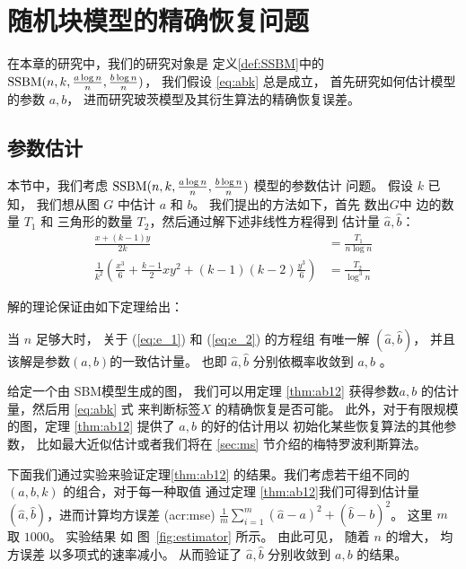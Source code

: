 
\chapter{随机块模型的精确恢复问题}\label{chap:sibm}

在本章的研究中，我们的研究对象是
定义\ref{def:SSBM}中的
$\operatorname{SSBM}(n,k,\frac{a \log n}{n}, \frac{b \log n}{n})$，
我们假设  \eqref{eq:abk} 总是成立，
首先研究如何估计模型的参数 $a,b$，
进而研究玻茨模型及其衍生算法的精确恢复误差。

\section{参数估计}

本节中，我们考虑 $\operatorname{SSBM}(n,k,\frac{a \log n}{n}, \frac{b \log n}{n})$ 模型的参数估计
问题。
假设 $k$ 已知，
我们想从图 $G$ 中估计
$a$ 和 $b$。
我们提出的方法如下，首先
数出$G$中 边的数量 $T_1$ 
和 三角形的数量
$T_2$，然后通过解下述非线性方程得到
估计量 $\hat{a}, \hat{b}$：
\begin{align}
\frac{x+(k-1)y}{2k} & = \frac{T_1}{n\log n} \label{eq:e_1}\\
\frac{1}{k^2}
\left(\frac{x^3}{6} + \frac{k-1}{2}xy^2 + (k-1)(k-2)\frac{y^3}{6}\right) & = \frac{T_2}{\log^3 n} \label{eq:e_2}
\end{align}

解的理论保证由如下定理给出：
\begin{theorem}\label{thm:ab12}
当 $n$ 足够大时，
关于 (\ref{eq:e_1}) 和
(\ref{eq:e_2}) 的方程组
有唯一解 $(\hat{a}, \hat{b})$，
并且该解是参数$(a,b)$的一致估计量。
也即 $\hat{a}, \hat{b}$ 
分别依概率收敛到 $a,b$ 。
\end{theorem}
给定一个由 SBM模型生成的图，
我们可以用定理
\ref{thm:ab12} 获得参数$a,b$ 
的估计量，然后用 \eqref{eq:abk}
式
来判断标签$X$ 的精确恢复是否可能。
此外，对于有限规模的图，定理 \ref{thm:ab12} 
提供了 $a,b$ 的好的估计用以
初始化某些恢复算法的其他参数，
比如最大近似估计或者我们将在
\ref{sec:ms} 节介绍的梅特罗波利斯算法。

下面我们通过实验来验证定理\ref{thm:ab12}
的结果。我们考虑若干组不同的
$(a,b,k)$ 的组合，对于每一种取值
通过定理 \ref{thm:ab12}我们可得到估计量
$(\hat{a}, \hat{b})$，进而计算均方误差
 (\gls{acr:mse}) $\frac{1}{m} \sum_{i=1}^m (\hat{a}-a)^2 + (\hat{b}-b)^2$。
 这里  $m$ 取 $1000$。
 实验结果 如
 图~\ref{fig:estimator} 所示。
 由此可见， 随着 $n$ 的增大，
 均方误差 以多项式的速率减小。
 从而验证了 $\hat{a}, \hat{b}$ 分别收敛到 $a,b$ 
的结果。

